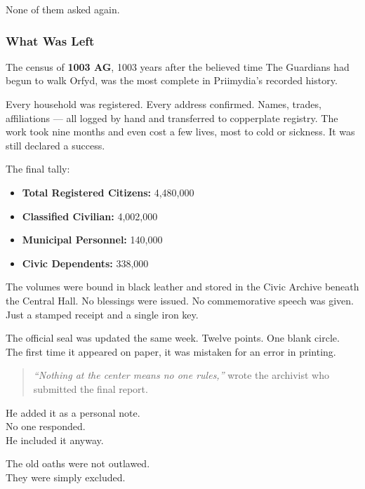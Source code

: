 \documentclass[12pt]{article}
\begin{document}
None of them asked again.

\dotfill

\subsubsection{What Was Left}

The census of \textbf{1003 AG}, 1003 years after the believed time The Guardians had begun to walk Orfyd, was the most complete in Priimydia’s recorded history.

Every household was registered. Every address confirmed. Names, trades, affiliations --- all logged by hand and transferred to copperplate registry. The work took nine months and even cost a few lives, most to cold or sickness. It was still declared a success.

The final tally:
\begin{itemize}
    \item \textbf{Total Registered Citizens:} 4,480,000
    \item \textbf{Classified Civilian:} 4,002,000
    \item \textbf{Municipal Personnel:} 140,000
    \item \textbf{Civic Dependents:} 338,000
\end{itemize}

The volumes were bound in black leather and stored in the Civic Archive beneath the Central Hall. No blessings were issued. No commemorative speech was given. Just a stamped receipt and a single iron key.

\vspace{1em}

The official seal was updated the same week. Twelve points. One blank circle. The first time it appeared on paper, it was mistaken for an error in printing.

\begin{quote}
\textit{“Nothing at the center means no one rules,”} wrote the archivist who submitted the final report.
\end{quote}

He added it as a personal note.\\
No one responded.\\
He included it anyway.

\vspace{1em}

The old oaths were not outlawed.\\
They were simply excluded.
\end{document}
